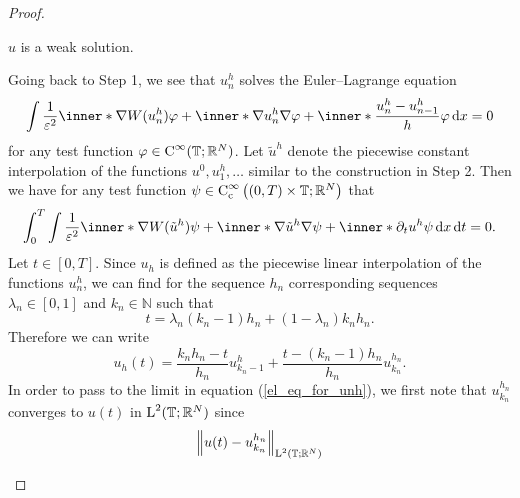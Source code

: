 \begin{proof}
\begin{description}[wide=0pt]
		\item[Step 7:] $ u $ is a weak solution.
		
		Going back to Step 1, we see that $ u_{ n }^{ h } $ solves the 
		Euler--Lagrange equation
		\begin{equation*}
			\int
			\frac{ 1 }{ \varepsilon^{ 2 } }
			\inner*{ \nabla W ( u_{ n }^{ h } ) }  { \varphi }
			+
			\inner*{ \nabla u_{ n }^{ h } }{ \nabla \varphi }
			+
			\inner*{ \frac{ u_{ n }^{ h } - u_{ n - 1 }^{ h } }{ h } }{ \varphi 
			}
			\dd{ x }
			=
			0
		\end{equation*}
		for any test function $ \varphi \in \operatorname{C}^{ \infty } ( \operatorname{\mathbb{T}} ; 
		\mathbb{ 
		R }^{ N } )  $.
		Let $ \tilde{ u }^{ h } $ denote the piecewise constant interpolation 
		of the functions $ u^{ 0 }, u_{ 1 }^{ h } , \dotsc $ similar to the 
		construction in Step 2. 
		Then we have for any test function $ \psi \in \operatorname{C}_{ \mathrm{ c } }^{ 
		\infty } \left( ( 0 , T ) \times \operatorname{\mathbb{T}} ; \mathbb{ R }^{ N } 
		\right) $ that
		\begin{equation}
				\label{el_eq_for_unh}
			\int_{ 0 }^{ T }
				\int
					\frac{ 1 }{ \varepsilon^{ 2 } }
					\inner*{ \nabla W ( \tilde{ u }^{ h } ) }{ \psi }
					+
					\inner*{ \nabla \tilde{ u }^{ h } }{ \nabla \psi }
					+
					\inner*{ \partial_{ t } u^{ h } }{ \psi }
				\dd{ x }
			\dd{ t }
			= 0.
		\end{equation}
		Let $ t \in [ 0 , T ] $. Since $ u_{ h } $ is defined as the piecewise 
		linear interpolation of the functions $ u_{ n}^{ h } $, we can find for 
		the sequence $ h_{ n } $ corresponding sequences $ \lambda_{ n } \in [ 
		0 , 1 ] $ and $ k_{ n } \in \mathbb{ N }$ such that 
		\begin{equation*}
			t = \lambda_{ n } ( k_{ n } - 1 ) h_{ n } + ( 1 - \lambda_{ n } ) 
			k_{ n } h_{ n } .
		\end{equation*}
		Therefore we can write
		\begin{equation*}
			u_{ h } ( t ) 
			=
			\frac{ k_{ n } h_{ n } - t }{ h_{ n } } u_{ k_{ n } - 1 }^{ h }
			+
			\frac{ t - ( k_{ n } - 1 ) h_{ n } }{ h_{ n } }
			u_{ k_{ n } }^{ h_{ n } }.
		\end{equation*}
		In order to pass to the limit in equation (\ref{el_eq_for_unh}), we first note that $ u_{ k_{ n } }^{ h_{ n } } $ converges to $ u ( t ) $ in $ \operatorname{L}^{ 2 } ( \operatorname{\mathbb{T}} ; \mathbb{ R }^{ N } ) $ since
		\begin{align*}
			\norm{ u ( t ) - u_{ k_{ n } }^{ h_{ n } } }_{ \lp^{ 2 } ( \flattorus ; \mathbb{ R }^{ N } ) }

\end{align*}
\end{description}
\end{proof}
